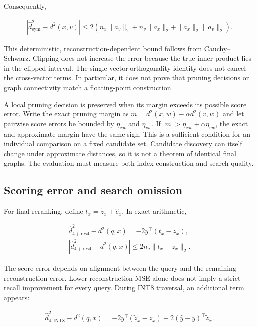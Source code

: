 Consequently,

\begin{equation}
\begin{gathered}
|\widehat d_{\mathrm{sym}}^2-d^2(x,v)|
\leq 2(n_x\|a_v\|_2+n_v\|a_x\|_2+\|a_x\|_2\|a_v\|_2).
\end{gathered}
\end{equation}

This deterministic, reconstruction-dependent bound follows from Cauchy--Schwarz. Clipping does not increase the error because the true inner product lies in the clipped interval. The single-vector orthogonality identity does not cancel the cross-vector terms. In particular, it does not prove that pruning decisions or graph connectivity match a floating-point construction.

A local pruning decision is preserved when its margin exceeds its possible score error. Write the exact pruning margin as $m=d^2(x,w)-\alpha d^2(v,w)$ and let pairwise score errors be bounded by $\eta_{xw}$ and $\eta_{vw}$. If $|m|>\eta_{xw}+\alpha\eta_{vw}$, the exact and approximate margin have the same sign. This is a sufficient condition for an individual comparison on a fixed candidate set. Candidate discovery can itself change under approximate distances, so it is not a theorem of identical final graphs. The evaluation must measure both index construction and search quality.

\subsection{Scoring error and search omission}

For final reranking, define $t_x=\widetilde z_x+\widehat e_x$. In exact arithmetic,

\begin{equation}
\begin{gathered}
\widehat d_{4+\mathrm{res4}}^2-d^2(q,x)
=-2y^\top(t_x-z_x),\\
|\widehat d_{4+\mathrm{res4}}^2-d^2(q,x)|\leq2n_q\|t_x-z_x\|_2.
\end{gathered}
\end{equation}

The score error depends on alignment between the query and the remaining reconstruction error. Lower reconstruction MSE alone does not imply a strict recall improvement for every query. During INT8 traversal, an additional term appears:

\begin{equation}
\begin{gathered}
\widehat d_{4,\mathrm{INT8}}^2-d^2(q,x)
=-2y^\top(\widetilde z_x-z_x)-2(\widehat y-y)^\top\widetilde z_x.
\end{gathered}
\end{equation}

